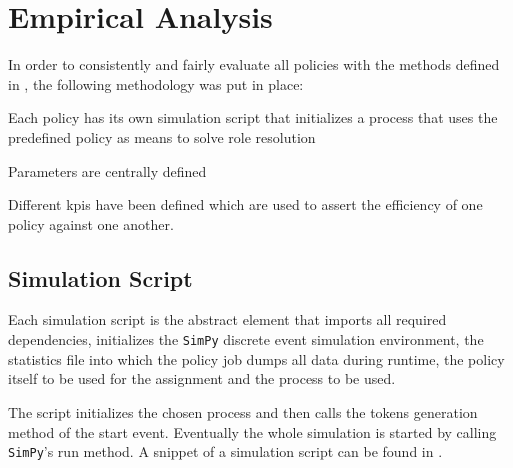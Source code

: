 \chapter{Empirical Analysis}
\label{ch:empirical_analysis}

In order to consistently and fairly evaluate all policies with the methods defined in , the following methodology was put in place:
\begin{enumerate*}
	\item Each policy has its own simulation script that initializes a process that uses the predefined policy as means to solve role resolution
	\item Parameters are centrally defined
	\item Different \glspl{kpi} have been defined which are used to assert the efficiency of one policy against one another.
\end{enumerate*}

\section{Simulation Script}

Each simulation script is the abstract element that imports all required dependencies, initializes the \texttt{SimPy} discrete event simulation environment, the statistics file into which the policy job dumps all data during runtime, the policy itself to be used for the assignment and the process to be used. 

The script initializes the chosen process and then calls the tokens generation method of the start event. Eventually the whole simulation is started by calling \texttt{SimPy}'s run method. A snippet of a simulation script can be found in .

